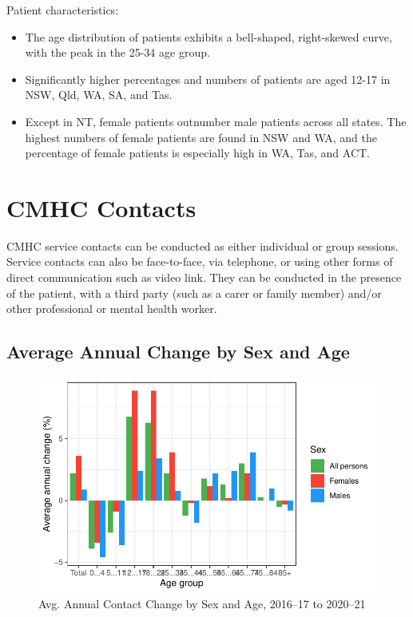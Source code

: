 \documentclass[
  a4paper,
  DIV=11,
  numbers=noendperiod]{scrreport}
\begin{document}
Patient characteristics:

\begin{itemize}
\item
  The age distribution of patients exhibits a bell-shaped, right-skewed
  curve, with the peak in the 25-34 age group.
\item
  Significantly higher percentages and numbers of patients are aged
  12-17 in NSW, Qld, WA, SA, and Tas.
\item
  Except in NT, female patients outnumber male patients across all
  states. The highest numbers of female patients are found in NSW and
  WA, and the percentage of female patients is especially high in WA,
  Tas, and ACT.
\end{itemize}

\hypertarget{cmhc-contacts}{%
\section{CMHC Contacts}\label{cmhc-contacts}}

CMHC service contacts can be conducted as either individual or group
sessions. Service contacts can also be face-to-face, via telephone, or
using other forms of direct communication such as video link. They can
be conducted in the presence of the patient, with a third party (such as
a carer or family member) and/or other professional or mental health
worker.

\hypertarget{average-annual-change-by-sex-and-age}{%
\subsection{Average Annual Change by Sex and
Age}\label{average-annual-change-by-sex-and-age}}

\begin{figure}

\caption{\label{fig-cmhc-csa}Avg. Annual Contact Change by Sex and Age,
2016--17 to 2020--21}

{\centering \includegraphics{./chap2-cmhc_files/figure-pdf/fig-cmhc-csa-1.pdf}

}

\end{figure}
\end{document}
